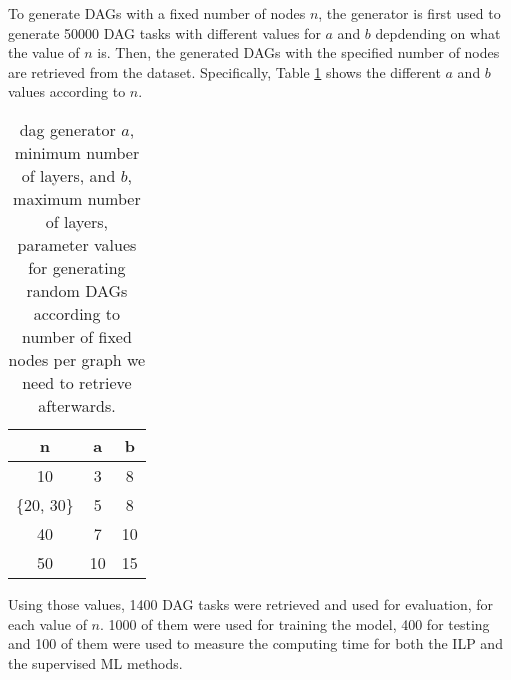 To generate DAGs with a fixed number of nodes $n$, 
the generator is first used to generate 50000 DAG tasks
with different values for $a$ and $b$ depdending on what 
the value of $n$ is. Then, the generated DAGs with 
the specified number of nodes are retrieved from the dataset.
Specifically, Table \ref{tab:layer_num_minmax} 
shows the different $a$ and $b$ values according to $n$.

\begin{table}
    \centering
    \begin{tabular}{|c|c|c|}    
        \hline
        \textbf{n} & \textbf{a} & \textbf{b} \\
        \hline
        10 & 3 & 8 \\
        \hline
        \{20, 30\} & 5 & 8 \\
        \hline
        40 & 7 & 10 \\
        \hline
        50 & 10 & 15 \\
        \hline
    \end{tabular}
    \caption{dag generator $a$, minimum number of layers, and $b$, maximum
    number of layers, parameter values for generating 
    random DAGs according to number of fixed nodes per graph we need to retrieve afterwards.}
    \label{tab:layer_num_minmax}
\end{table}

Using those values, 1400 DAG tasks were retrieved and used for 
evaluation, for each value of $n$.
1000 of them were used for training the model, 400 for testing
and 100 of them were used to measure the computing time 
for both the ILP and the supervised ML methods.

